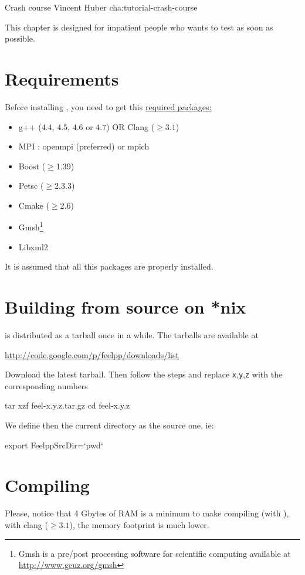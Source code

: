             {Crash course}
            {Vincent Huber}
            {cha:tutorial-crash-course}

This chapter is designed for impatient people who wants to test \feel as soon as possible.
\section{Requirements}
Before installing \feel, you need to get this \underline{required packages:}\\
\begin{itemize}
\item g++ ($4.4$, $4.5$, $4.6$ or $4.7$) OR Clang ($\geq 3.1$)
\item MPI : openmpi (preferred) or mpich
\item Boost ($\geq$1.39)
\item Petsc ($\geq$2.3.3)
\item Cmake ($\geq$2.6)
\item Gmsh\footnote{Gmsh is a pre/post processing software for scientific
computing available at \url{http://www.geuz.org/gmsh}}
\item Libxml2
\end{itemize}
It is assumed that all this packages are properly installed.

\section{Building \feel from source on *nix}
\feel is distributed as a tarball once in a while. The tarballs are available
at
\begin{center}
  \href{http://code.google.com/p/feelpp/downloads/list}{http://code.google.com/p/feelpp/downloads/list}
\end{center}
Download the latest tarball. Then follow the steps and replace
\texttt{x},\texttt{y},\texttt{z} with the corresponding numbers

\begin{unixcom}
  tar xzf feel-x.y.z.tar.gz
  cd feel-x.y.z
\end{unixcom}
We define then the current directory as the source one, ie:
\begin{unixcom}
  export FeelppSrcDir=`pwd`
\end{unixcom}

\section{Compiling}
Please, notice that 4 Gbytes of RAM is a minimum to make \feel compiling (with ), with clang ($\geq3.1$), the memory footprint is much lower.

